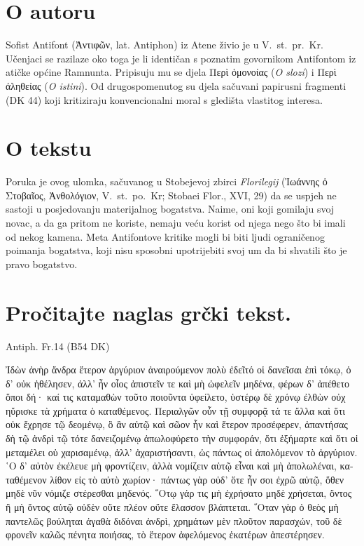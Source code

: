 \section*{O autoru}

Sofist Antifont \textgreek[variant=ancient]{(Ἀντιφῶν,} lat. Antiphon) iz Atene živio je u V.~st.\ pr.~Kr. Učenjaci se razilaze oko toga je li identičan s poznatim govornikom Antifontom iz atičke općine Ramnunta. Pripisuju mu se djela \textgreek[variant=ancient]{Περὶ ὁμονοίας} (\textit{O slozi}) i \textgreek[variant=ancient]{Περὶ ἀληθείας} (\textit{O istini}). Od drugospomenutog su djela sačuvani papirusni fragmenti (DK 44) koji kritiziraju konvencionalni moral s gledišta vlastitog interesa.

\section*{O tekstu}

Poruka je ovog ulomka, sačuvanog u Stobejevoj zbirci \textit{Florilegij} \textgreek[variant=ancient]{(Ἰωάννης ὁ Στοβαῖος,  Ἀνθολόγιον,} V.~st.\ po.~Kr; Stobaei Flor., XVI, 29) da se uspjeh ne sastoji u posjedovanju materijalnog bogatstva. Naime, oni koji gomilaju svoj novac, a da ga pritom ne koriste, nemaju veću korist od njega nego što bi imali od nekog kamena. Meta Antifontove kritike mogli bi biti ljudi ograničenog poimanja bogatstva, koji nisu sposobni upotrijebiti svoj um da bi shvatili što je pravo bogatstvo.


\section*{Pročitajte naglas grčki tekst.}

Antiph. Fr.14 (B54 DK)


\medskip

\begin{greek}
{\large
{ \noindent Ἰδὼν ἀνὴρ ἄνδρα ἕτερον ἀργύριον ἀναιρούμενον πολὺ ἐδεῖτό οἱ δανεῖσαι ἐπὶ τόκῳ, ὁ δ' οὐκ ἠθέλησεν, ἀλλ' ἦν οἷος ἀπιστεῖν τε καὶ μὴ ὠφελεῖν μηδένα, φέρων δ' ἀπέθετο ὅποι δή· καί τις καταμαθὼν τοῦτο ποιοῦντα ὑφείλετο, ὑστέρῳ δὲ χρόνῳ ἐλθὼν οὐχ ηὕρισκε τὰ χρήματα ὁ καταθέμενος. Περιαλγῶν οὖν τῇ συμφορᾷ τά τε ἄλλα καὶ ὅτι οὐκ ἔχρησε τῷ δεομένῳ, ὃ ἂν αὐτῷ καὶ σῶον ἦν καὶ ἕτερον προσέφερεν, ἀπαντήσας δὴ τῷ ἀνδρὶ τῷ τότε δανειζομένῳ ἀπωλοφύρετο τὴν συμφοράν, ὅτι ἐξήμαρτε καὶ ὅτι οἱ μεταμέλει οὐ χαρισαμένῳ, ἀλλ' ἀχαριστήσαντι, ὡς πάντως οἱ ἀπολόμενον τὸ ἀργύριον. ῾Ο δ' αὐτὸν ἐκέλευε μὴ φροντίζειν, ἀλλὰ νομίζειν αὑτῷ εἶναι καὶ μὴ ἀπολωλέναι, καταθέμενον λίθον εἰς τὸ αὐτὸ χωρίον· πάντως γὰρ οὐδ' ὅτε ἦν σοι ἐχρῶ αὐτῷ, ὅθεν μηδὲ νῦν νόμιζε στέρεσθαι μηδενός. ῞Οτῳ γάρ τις μὴ ἐχρήσατο μηδὲ χρήσεται, ὄντος ἢ μὴ ὄντος αὐτῷ οὐδὲν οὔτε πλέον οὔτε ἔλασσον βλάπτεται. ῞Οταν γὰρ ὁ θεὸς μὴ παντελῶς βούληται ἀγαθὰ διδόναι ἀνδρὶ, χρημάτων μὲν πλοῦτον παρασχών, τοῦ δὲ φρονεῖν καλῶς πένητα ποιήσας, τὸ ἕτερον ἀφελόμενος ἑκατέρων ἀπεστέρησεν.

}
}
\end{greek}

